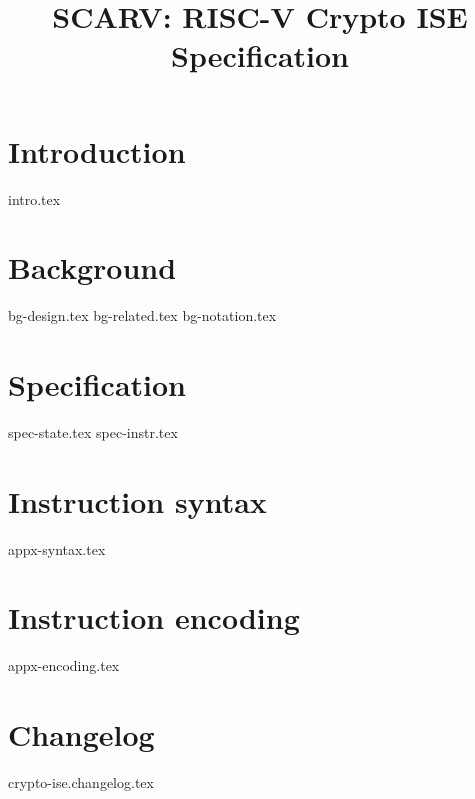 \documentclass{article}
\title{SCARV: RISC-V Crypto ISE \\ Specification}
\begin{document}
\maketitle \tableofcontents


\section{Introduction}
\label{sec:intro}

{intro.tex}


\section{Background}
\label{sec:bg}

{bg-design.tex}
{bg-related.tex}
{bg-notation.tex}


\section{Specification}
\label{sec:spec}

{spec-state.tex}
{spec-instr.tex}


\printbibliography


\appendix

\newpage
\section{Instruction syntax}
\label{appx:syntax}

{appx-syntax.tex}

\newpage
\section{Instruction encoding}
\label{appx:encoding}

{appx-encoding.tex}



\newpage
\section{Changelog}
{crypto-ise.changelog.tex}
\end{document}
